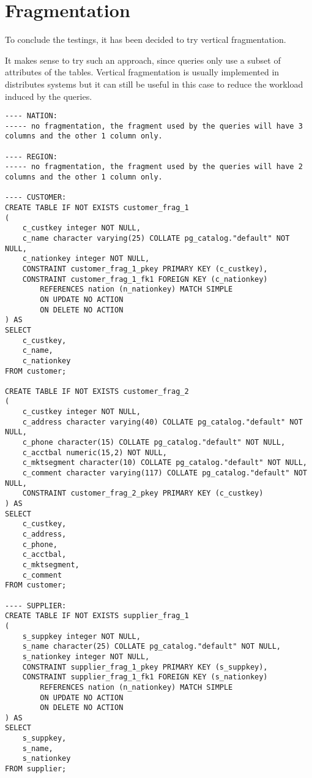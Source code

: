 

\section{Fragmentation}

To conclude the testings, it has been decided to try vertical fragmentation.

It makes sense to try such an approach, since queries only use a subset of attributes of the tables. Vertical fragmentation is usually implemented in distributes systems but it can still be useful in this case to reduce the workload induced by the queries.

\begin{lstlisting}
---- NATION: 
----- no fragmentation, the fragment used by the queries will have 3 columns and the other 1 column only.

---- REGION:
----- no fragmentation, the fragment used by the queries will have 2 columns and the other 1 column only.

---- CUSTOMER:
CREATE TABLE IF NOT EXISTS customer_frag_1
(
    c_custkey integer NOT NULL,
    c_name character varying(25) COLLATE pg_catalog."default" NOT NULL,
    c_nationkey integer NOT NULL,
    CONSTRAINT customer_frag_1_pkey PRIMARY KEY (c_custkey),
    CONSTRAINT customer_frag_1_fk1 FOREIGN KEY (c_nationkey)
        REFERENCES nation (n_nationkey) MATCH SIMPLE
        ON UPDATE NO ACTION
        ON DELETE NO ACTION
) AS
SELECT
	c_custkey,
	c_name,
	c_nationkey
FROM customer;

CREATE TABLE IF NOT EXISTS customer_frag_2
(
	c_custkey integer NOT NULL,
    c_address character varying(40) COLLATE pg_catalog."default" NOT NULL,
    c_phone character(15) COLLATE pg_catalog."default" NOT NULL,
    c_acctbal numeric(15,2) NOT NULL,
    c_mktsegment character(10) COLLATE pg_catalog."default" NOT NULL,
    c_comment character varying(117) COLLATE pg_catalog."default" NOT NULL,
    CONSTRAINT customer_frag_2_pkey PRIMARY KEY (c_custkey)
) AS
SELECT
	c_custkey,
	c_address,
	c_phone,
	c_acctbal,
	c_mktsegment,
	c_comment
FROM customer;

---- SUPPLIER:
CREATE TABLE IF NOT EXISTS supplier_frag_1
(
    s_suppkey integer NOT NULL,
    s_name character(25) COLLATE pg_catalog."default" NOT NULL,
    s_nationkey integer NOT NULL,
    CONSTRAINT supplier_frag_1_pkey PRIMARY KEY (s_suppkey),
    CONSTRAINT supplier_frag_1_fk1 FOREIGN KEY (s_nationkey)
        REFERENCES nation (n_nationkey) MATCH SIMPLE
        ON UPDATE NO ACTION
        ON DELETE NO ACTION
) AS
SELECT
	s_suppkey,
	s_name,
	s_nationkey
FROM supplier;


\end{lstlisting}
